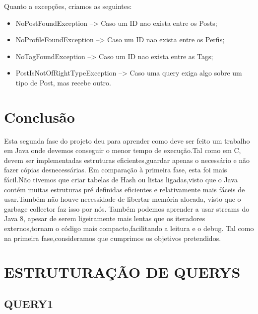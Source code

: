 \documentclass[letterpaper, 10 pt, conference]{IEEEtran}  %
\begin{document}
Quanto a excepções, criamos as seguintes:
\begin{itemize}
     \item NoPostFoundException --> Caso um ID nao exista entre os Posts;
     \item NoProfileFoundException --> Caso um ID nao exista entre os Perfis;
     \item NoTagFoundException --> Caso um ID nao exista entre as Tags;
     \item PostIsNotOfRightTypeException --> Caso uma query exiga algo sobre um tipo de Post, mas recebe outro.
\end{itemize}

\section{Conclusão}

Esta segunda fase do projeto deu para aprender como deve ser feito um trabalho em Java onde devemos conseguir o menor tempo de execução.Tal como em C, devem ser implementadas estruturas eficientes,guardar apenas o necessário e não fazer cópias desnecessárias.
\newline
Em comparação à primeira fase, esta foi mais fácil.Não tivemos que criar tabelas de Hash ou listas ligadas,visto que o Java contém muitas estruturas pré definidas eficientes e relativamente mais fáceis de usar.Também não houve necessidade de libertar memória alocada, visto que o garbage collector faz isso por nós.
\newline
Também podemos aprender a usar streams do Java 8, apesar de serem ligeiramente mais lentas que os iteradores externos,tornam o código mais compacto,facilitando a leitura e o debug.
\newline
Tal como na primeira fase,consideramos que cumprimos os objetivos pretendidos.







\section{ESTRUTURAÇÃO DE QUERYS}

\subsection{QUERY1}
\end{document}
